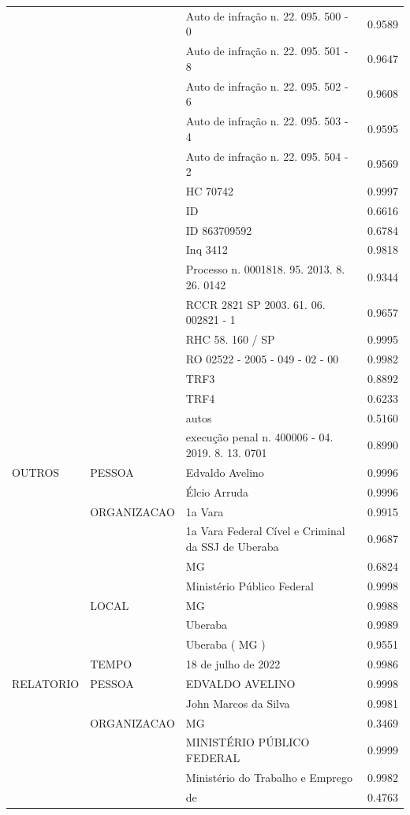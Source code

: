 \begin{table}
\begin{tabular}{llp{6cm}r}
 &  & Auto de infração n. 22. 095. 500 - 0 & 0.9589 \\
 &  & Auto de infração n. 22. 095. 501 - 8 & 0.9647 \\
 &  & Auto de infração n. 22. 095. 502 - 6 & 0.9608 \\
 &  & Auto de infração n. 22. 095. 503 - 4 & 0.9595 \\
 &  & Auto de infração n. 22. 095. 504 - 2 & 0.9569 \\
 &  & HC 70742 & 0.9997 \\
 &  & ID & 0.6616 \\
 &  & ID 863709592 & 0.6784 \\
 &  & Inq 3412 & 0.9818 \\
 &  & Processo n. 0001818. 95. 2013. 8. 26. 0142 & 0.9344 \\
 &  & RCCR 2821 SP 2003. 61. 06. 002821 - 1 & 0.9657 \\
 &  & RHC 58. 160 / SP & 0.9995 \\
 &  & RO 02522 - 2005 - 049 - 02 - 00 & 0.9982 \\
 &  & TRF3 & 0.8892 \\
 &  & TRF4 & 0.6233 \\
 &  & autos & 0.5160 \\
 &  & execução penal n. 400006 - 04. 2019. 8. 13. 0701 & 0.8990 \\
OUTROS & PESSOA & Edvaldo Avelino & 0.9996 \\
 &  & Élcio Arruda & 0.9996 \\
 & ORGANIZACAO & 1a Vara & 0.9915 \\
 &  & 1a Vara Federal Cível e Criminal da SSJ de Uberaba & 0.9687 \\
 &  & MG & 0.6824 \\
 &  & Ministério Público Federal & 0.9998 \\
 & LOCAL & MG & 0.9988 \\
 &  & Uberaba & 0.9989 \\
 &  & Uberaba ( MG ) & 0.9551 \\
 & TEMPO & 18 de julho de 2022 & 0.9986 \\
RELATORIO & PESSOA & EDVALDO AVELINO & 0.9998 \\
 &  & John Marcos da Silva & 0.9981 \\
 & ORGANIZACAO & MG & 0.3469 \\
 &  & MINISTÉRIO PÚBLICO FEDERAL & 0.9999 \\
 &  & Ministério do Trabalho e Emprego & 0.9982 \\
 &  & de & 0.4763 \\

\end{tabular}
\end{table}
